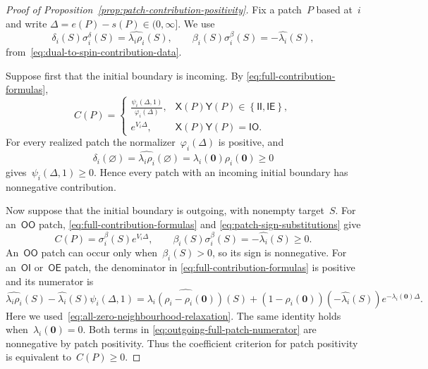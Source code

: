 \documentclass[EJP,preprint,NODS,nobera]{ejpecp}
\newcommand{\bb}[1]{\left(#1\right)}
\newcommand{\cb}[1]{\left\{#1\right\}}
\newcommand{\mb}[1]{\mathbf{#1}}
\begin{document}
\begin{proof}[Proof of Proposition~\ref{prop:patch-contribution-positivity}]
Fix a patch~$P$ based at~$i$ and write
$\Delta=e(P)-s(P)\in(0,\infty]$. We use
\begin{equation}
\label{eq:patch-sign-substitutions}
\delta_i(S)\sigma_i^\delta(S)
=
\widehat{\lambda_i\rho_i}(S),
\qquad
\beta_i(S)\sigma_i^\beta(S)
=
-\widehat{\lambda_i}(S),
\end{equation}
from~\eqref{eq:dual-to-spin-contribution-data}.

Suppose first that the initial boundary is incoming. By
\eqref{eq:full-contribution-formulas},
\begin{equation*}
C(P)
=
\begin{cases}
\displaystyle
\frac{\psi_i(\Delta,1)}{\varphi_i(\Delta)},
&\mathsf X(P)\mathsf Y(P)\in\cb{\mathsf{II},\mathsf{IE}},
\\[1em]
e^{V_i\Delta},
&\mathsf X(P)\mathsf Y(P)=\mathsf{IO}.
\end{cases}
\end{equation*}
For every realized patch the normalizer~$\varphi_i(\Delta)$ is positive, and
\begin{equation*}
\delta_i(\varnothing)
=
\widehat{\lambda_i\rho_i}(\varnothing)
=
\lambda_i(\mb 0)\rho_i(\mb 0)
\geq0
\end{equation*}
gives~$\psi_i(\Delta,1)\geq0$. Hence every patch with an incoming
initial boundary has nonnegative contribution.

Now suppose that the initial boundary is outgoing, with nonempty target~$S$.
For an~$\mathsf{OO}$ patch,
\eqref{eq:full-contribution-formulas} and
\eqref{eq:patch-sign-substitutions} give
\begin{equation*}
C(P)
=
\sigma_i^\beta(S)e^{V_i\Delta},
\qquad
\beta_i(S)\sigma_i^\beta(S)
=
-\widehat{\lambda_i}(S)
\geq0.
\end{equation*}
An~$\mathsf{OO}$ patch can occur only when~$\beta_i(S)>0$, so its sign is
nonnegative. For an~$\mathsf{OI}$ or~$\mathsf{OE}$ patch, the denominator in
\eqref{eq:full-contribution-formulas} is positive and its numerator is
\begin{equation}
\widehat{\lambda_i\rho_i}(S)
-
\widehat{\lambda_i}(S)\psi_i(\Delta,1)
=
\widehat{\lambda_i\bb{\rho_i-\rho_i(\mb 0)}}(S)
+
\bb{1-\rho_i(\mb 0)}
\bb{-\widehat{\lambda_i}(S)}
e^{-\lambda_i(\mb 0)\Delta}.
\label{eq:outgoing-full-patch-numerator}
\end{equation}
Here we used~\eqref{eq:all-zero-neighbourhood-relaxation}. The same identity
holds when~$\lambda_i(\mb 0)=0$. Both terms in
\eqref{eq:outgoing-full-patch-numerator} are nonnegative by patch positivity. Thus the coefficient criterion for patch positivity is equivalent to~$C(P)\geq 0$.


\end{proof}
\end{document}
